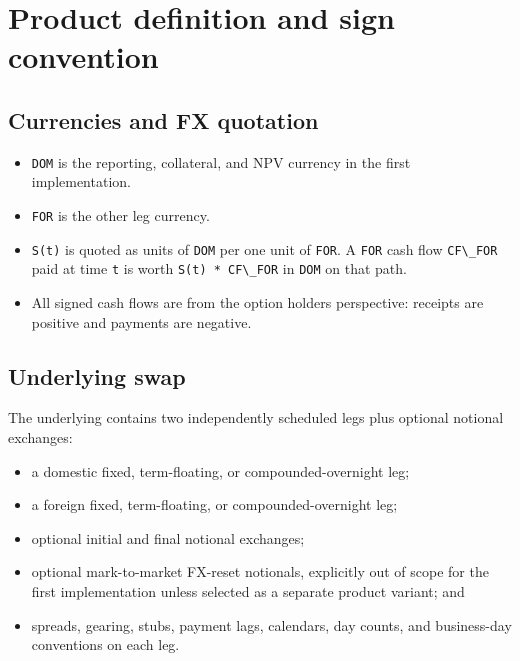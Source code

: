 \documentclass[conference]{IEEEtran}
\newcommand{\passthrough}[1]{#1}
\providecommand{\tightlist}{}
\begin{document}
\section{Product definition and sign
convention}\label{2-product-definition-and-sign-convention}

\subsection{Currencies and FX
quotation}\label{21-currencies-and-fx-quotation}

\begin{itemize}
\tightlist
\item
  \passthrough{\lstinline!DOM!} is the reporting, collateral, and NPV
  currency in the first implementation.
\item
  \passthrough{\lstinline!FOR!} is the other leg currency.
\item
  \passthrough{\lstinline!S(t)!} is quoted as units of
  \passthrough{\lstinline!DOM!} per one unit of
  \passthrough{\lstinline!FOR!}. A \passthrough{\lstinline!FOR!} cash
  flow \passthrough{\lstinline!CF\_FOR!} paid at time
  \passthrough{\lstinline!t!} is worth
  \passthrough{\lstinline!S(t) * CF\_FOR!} in
  \passthrough{\lstinline!DOM!} on that path.
\item
  All signed cash flows are from the option holder\textquotesingle s
  perspective: receipts are positive and payments are negative.
\end{itemize}

\subsection{Underlying swap}\label{22-underlying-swap}

The underlying contains two independently scheduled legs plus optional
notional exchanges:

\begin{itemize}
\tightlist
\item
  a domestic fixed, term-floating, or compounded-overnight leg;
\item
  a foreign fixed, term-floating, or compounded-overnight leg;
\item
  optional initial and final notional exchanges;
\item
  optional mark-to-market FX-reset notionals, explicitly out of scope
  for the first implementation unless selected as a separate product
  variant; and
\item
  spreads, gearing, stubs, payment lags, calendars, day counts, and
  business-day conventions on each leg.
\end{itemize}
\end{document}
